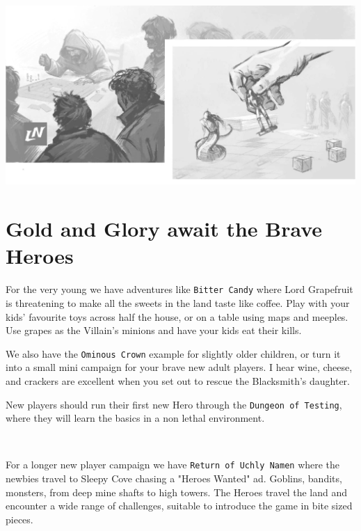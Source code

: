\vfill

\begin{center}
\includegraphics[width=0.999\textwidth]{./fig/tabletop.jpg}
\end{center}








\clearpage %

\section*{Gold and Glory await the Brave Heroes}

\noindent
For the very young we have adventures like \texttt{Bitter Candy} where Lord Grapefruit is threatening to make all the sweets in the land taste like coffee. Play with your kids' favourite toys across half the house, or on a table using maps and meeples. Use grapes as the Villain's minions and have your kids eat their kills.

We also have the \texttt{Ominous Crown} example for slightly older children, or turn it into a small mini campaign for your brave new adult players. I hear wine, cheese, and crackers are excellent when you set out to rescue the Blacksmith's daughter.

New players should run their first new Hero through the \texttt{Dungeon of Testing}, where they will learn the basics in a non lethal environment.

\

\noindent
For a longer new player campaign we have \texttt{Return of Uchly Namen} where the newbies travel to Sleepy Cove chasing a "Heroes Wanted" ad. Goblins, bandits, monsters, from deep mine shafts to high towers. The Heroes travel the land and encounter a wide range of challenges, suitable to introduce the game in bite sized pieces.

